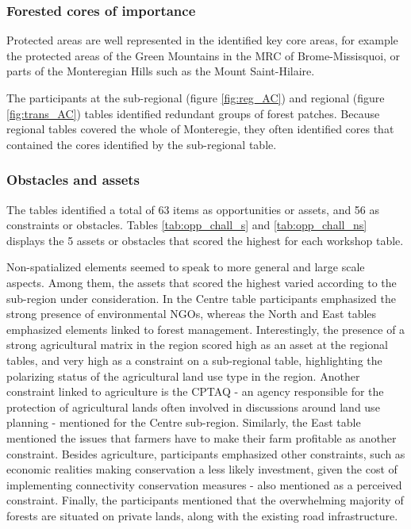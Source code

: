 \subsubsection{Forested cores of importance} 

Protected areas are well represented in the identified key core areas, for example the protected areas of the Green Mountains in the MRC of Brome-Missisquoi, or parts of the Monteregian Hills such as the Mount Saint-Hilaire. 

The participants at the sub-regional (figure \ref{fig:reg_AC}) and regional (figure \ref{fig:trans_AC}) tables identified redundant groups of forest patches. Because regional tables covered the whole of Monteregie, they often identified cores that contained the cores identified by the sub-regional table. \\

\subsubsection{Obstacles and assets}

The tables identified a total of 63 items as opportunities or assets, and 56 as constraints or obstacles. Tables \ref{tab:opp_chall_s} and \ref{tab:opp_chall_ns} displays the 5 assets or obstacles that scored the highest for each workshop table. 

Non-spatialized elements seemed to speak to more general and large scale aspects. Among them, the assets that scored the highest varied according to the sub-region under consideration. In the Centre table participants emphasized the strong presence of environmental NGOs, whereas the North and East tables emphasized elements linked to forest management. Interestingly, the presence of a strong agricultural matrix in the region scored high as an asset at the regional tables, and very high as a constraint on a sub-regional table, highlighting the polarizing status of the agricultural land use type in the region. Another constraint linked to agriculture is the CPTAQ - an agency responsible for the protection of agricultural lands often involved in discussions around land use planning - mentioned for the Centre sub-region. Similarly, the East table mentioned the issues that farmers have to make their farm profitable as another constraint. Besides agriculture, participants emphasized other constraints, such as economic realities making conservation a less likely investment, given the cost of implementing connectivity conservation measures - also mentioned as a perceived constraint. Finally, the participants mentioned that the overwhelming majority of forests are situated on private lands, along with the existing road infrastructure.

